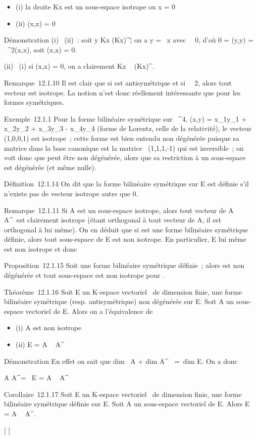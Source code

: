 \documentclass[]{article}
\begin{document}
\begin{itemize}
\itemsep1pt\parskip0pt
\item
  (i) la droite Kx est un sous-espace isotrope ou x = 0
\item
  (ii) \phi(x,x) = 0
\end{itemize}

Démonstration (i) \rigtharrow~(ii)~: soit y \in Kx \bigcap
(Kx)^\bot\diagdown\0\~; on a y = \lambda~x
avec \lambda~\neq~0, d'où 0 = \phi(y,y) =
\lambda~^2\phi(x,x), soit \phi(x,x) = 0.

(ii) \rigtharrow~(i) si \phi(x,x) = 0, on a clairement Kx \subset~ (Kx)^\bot.

Remarque~12.1.10 Il est clair que si \phi est antisymétrique et si
\mathrmcarK\mathrel\neq~~2,
alors tout vecteur est isotrope. La notion n'est donc réellement
intéressante que pour les formes symétriques.

Exemple~12.1.1 Pour la forme bilinéaire symétrique sur ~^4,
\phi(x,y) = x_1y_1 + x_2y_2 +
x_3y_3 - x_4y_4 (forme de Lorentz,
celle de la relativité), le vecteur (1,0,0,1) est isotrope~; cette forme
est bien entendu non dégénérée puisque sa matrice dans la base canonique
est la matrice
\mathrmdiag~(1,1,1,-1) qui
est inversible~; on voit donc que \phi peut être non dégénérée, alors que
sa restriction à un sous-espace est dégénérée (et même nulle).

Définition~12.1.14 On dit que la forme bilinéaire symétrique \phi sur E est
définie s'il n'existe pas de vecteur isotrope autre que 0.

Remarque~12.1.11 Si A est un sous-espace isotrope, alors tout vecteur de
A \bigcap A^\bot\diagdown\0\ est clairement
isotrope (étant orthogonal à tout vecteur de A, il est orthogonal à lui
même). On en déduit que si \phi est une forme bilinéaire symétrique
définie, alors tout sous-espace de E est non isotrope. En particulier, E
lui même est non isotrope et donc

Proposition~12.1.15 Soit \phi une forme bilinéaire symétrique définie~;
alors \phi est non dégénérée et tout sous-espace est non isotrope pour \phi.

Théorème~12.1.16 Soit E un K-espace vectoriel ~de dimension finie, \phi une
forme bilinéaire symétrique (resp. antisymétrique) non dégénérée sur E.
Soit A un sous-espace vectoriel de E. Alors on a l'équivalence de

\begin{itemize}
\itemsep1pt\parskip0pt
\item
  (i) A est non isotrope
\item
  (ii) E = A \oplus~ A^\bot
\end{itemize}

Démonstration En effet on sait que dim~ A
+ dim A^\bot~ =\
dim E. On a donc

A \bigcap A^\bot = \0\
\Leftrightarrow E = A \oplus~ A^\bot

Corollaire~12.1.17 Soit E un K-espace vectoriel ~de dimension finie, \phi
une forme bilinéaire symétrique définie sur E. Soit A un sous-espace
vectoriel de E. Alors E = A \oplus~ A^\bot.

[
[
\end{document}
